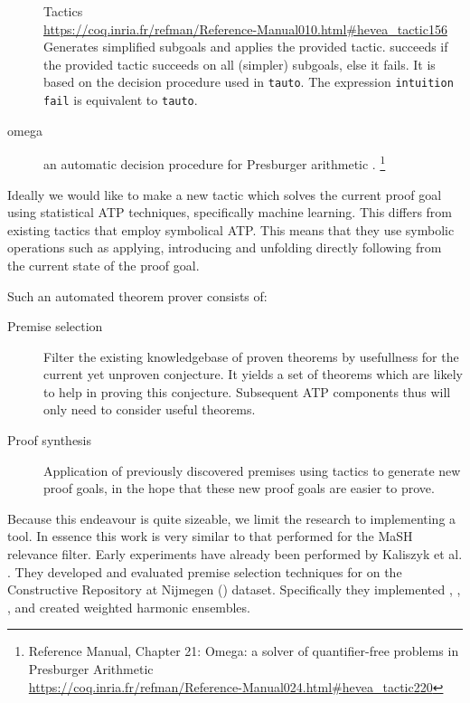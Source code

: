 \begin{description}
{    Tactics\\
    \url{https://coq.inria.fr/refman/Reference-Manual010.html\#hevea_tactic156}
  }
  Generates simplified subgoals and applies the provided tactic.
   succeeds if the provided tactic succeeds on all (simpler) subgoals, else it fails.
  It is based on the decision procedure used in \texttt{tauto}.
  The expression \texttt{intuition fail} is equivalent to \texttt{tauto}.
\item[omega]
  an automatic decision procedure for Presburger arithmetic \cite{stansifer1984presburger}.%
  \footnote{
    \coq Reference Manual, Chapter 21:
    Omega: a solver of quantifier-free problems in Presburger Arithmetic\\
    \url{https://coq.inria.fr/refman/Reference-Manual024.html\#hevea_tactic220}
  }
\end{description}

Ideally we would like to make a new tactic which solves the current proof goal using statistical ATP techniques, specifically machine learning.
This differs from existing tactics that employ symbolical ATP.
This means that they use symbolic operations such as applying, introducing and unfolding
directly following from the current state of the proof goal. 

Such an automated theorem prover consists of:
\begin{description}
\item[Premise selection] Filter the existing knowledgebase of proven theorems by usefullness for the current yet unproven conjecture.
It yields a set of theorems which are likely to help in proving this conjecture.
Subsequent ATP components thus will only need to consider useful theorems. 
\item[Proof synthesis] Application of previously discovered premises using tactics to generate new proof goals,
in the hope that these new proof goals are easier to prove.
\end{description}

Because this endeavour is quite sizeable, we limit the research to implementing a \premiseselection tool.
In essence this work is very similar to that performed for the MaSH relevance filter.
Early experiments have already been performed by Kaliszyk et al. \cite{kaliszyk2014machine}.
They developed and evaluated premise selection techniques for \coq on the Constructive \coq Repository at Nijmegen (\corn) dataset.
Specifically they implemented \knn, \nb, \mepo, and created weighted harmonic ensembles.


